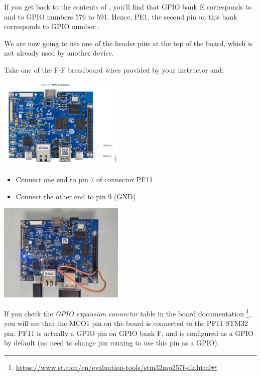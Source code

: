 If you get back to the contents of , you'll
find that GPIO bank E corresponds to  and to GPIO
numbers 576 to 591. Hence, PE1, the second pin on this bank corresponds to
GPIO number \gpionum.
\fi

\if{}
We are now going to use one of the header pins at the top of the
board, which is not already used by another device.

Take one of the F-F breadboard wires provided by your instructor and:

\begin{center}
  \includegraphics[width=6cm]{labs/sysdev-accessing-hardware-stm32/stm32mp2_pin_map.png}
\end{center}

\begin{itemize}
\item Connect one end to pin 7 of connector PF11
\item Connect the other end to pin 9 (GND)
\end{itemize}


\begin{center}
  \includegraphics[width=6cm]{labs/sysdev-accessing-hardware-stm32/stm32mp2_gpio_to_gnd.jpg}
\end{center}

If you check the {\em GPIO expansion connector} table in the board
documentation
\footnote{\url{https://www.st.com/en/evaluation-tools/stm32mp257f-dk.html}},
you will see that the MCO1 pin on the board is connected to the PF11
STM32 pin. PF11 is actually a GPIO pin on GPIO bank F, and is configured
as a GPIO by default (no need to change pin muxing to use this pin as
a GPIO).

